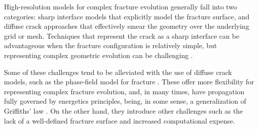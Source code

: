     High-resolution models for complex fracture evolution generally fall into two categories: sharp interface models that explicitly model the fracture surface, and diffuse crack approaches that effectively smear the geometry over the underlying grid or mesh.  Techniques that represent the crack as a sharp interface can be advantageous when the fracture configuration is relatively simple, but representing complex geometric evolution can be challenging  \cite{gupta2014simulation, gupta2018coupled, shauer2022three}.
    
    Some of these challenges tend to be alleviated with the use of diffuse crack models, such as the phase-field model for fracture \cite{francfort1998revisiting, bourdin2000numerical, karma2001phase}. These offer more flexibility for representing complex fracture evolution, and, in many times, have propagation fully governed by energetics principles, being, in some sense, a generalization of Griffiths' law \cite{griffith1921vi}. On the other hand, they introduce other challenges such as the lack of a well-defined fracture surface and increased computational expense\cite{heider2021review}.  







